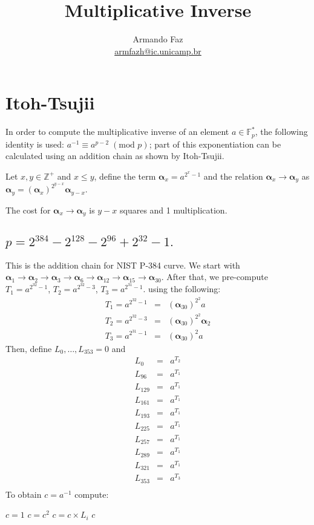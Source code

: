 \documentclass{article}
\title{Multiplicative Inverse}
\author{Armando Faz\\\footnotesize{\url{armfazh@ic.unicamp.br}}}
\date{}
\begin{document}
\maketitle

\section{Itoh-Tsujii}
 In order to compute the multiplicative inverse 
of an element $a\in \mathbb{F}_p^*$, the following identity is used: $a^{-1}\equiv 
a^{p-2}\; (\textrm{mod }p)$; part of this exponentiation can be calculated using an addition chain as shown by Itoh-Tsujii.

Let $x,y\in \mathbb{Z}^+$ and $x\leq y$, define the term $\bm{\alpha}_{x} = a^{2^x-1}$ and the relation $\bm{\alpha}_x\rightarrow \bm{\alpha}_y$ as $\bm{\alpha}_{y}=(\bm{\alpha}_x)^{2^{y-x}}\bm{\alpha}_{y-x}$.

The cost for $\bm{\alpha}_x\rightarrow \bm{\alpha}_y$ is $y-x$ squares and 1 multiplication.


\subsection{$p=2^{384}-2^{128}-2^{96}+2^{32}-1.$}
This is the addition chain for NIST P-384 curve. We start with $
\bm{\alpha}_{1} \rightarrow \bm{\alpha}_{2}  \rightarrow \bm{\alpha}_{3}  \rightarrow 
\bm{\alpha}_{6} \rightarrow \bm{\alpha}_{12} \rightarrow \bm{\alpha}_{15} \rightarrow 
\bm{\alpha}_{30}$. After that, we pre-compute $T_1 = a^{2^{32}-1}$, $T_2 = a^{2^{32}-3}$, $T_3 = a^{2^{31}-1}$.
using the following:
\begin{eqnarray*}
 T_1 = a^{2^{32}-1} &=& (\bm{\alpha}_{30})^{2^2}a \\
 T_2 = a^{2^{32}-3} &=& (\bm{\alpha}_{30})^{2^2}\bm{\alpha}_2 \\
 T_3 = a^{2^{31}-1} &=& (\bm{\alpha}_{30})^{2}a 
\end{eqnarray*}
Then, define  $L_{0},\dots,L_{353}= 0$ and 
\begin{eqnarray*}
 L_{0  } &=& a^{T_2} \\
 L_{96 } &=& a^{T_1} \\
 L_{129} &=& a^{T_1} \\
 L_{161} &=& a^{T_1} \\
 L_{193} &=& a^{T_1} \\
 L_{225} &=& a^{T_1} \\
 L_{257} &=& a^{T_1} \\
 L_{289} &=& a^{T_1} \\
 L_{321} &=& a^{T_1} \\
 L_{353} &=& a^{T_3} \\
\end{eqnarray*}
To obtain $c =a^{-1}$ compute:
\begin{algorithmic}
 \STATE $c = 1$
	\STATE $c= c^2$
		\STATE  $c = c\times L_i$
	\ENDIF
 \ENDFOR
 \RETURN $c$
\end{algorithmic}
\end{document}
